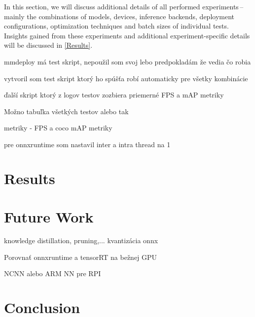 In this section, we will discuss additional details of all performed
experiments\,--\,mainly the combinations of models, devices, inference backends,
deployment configurations, optimization techniques and batch sizes of individual
tests. Insights gained from these experiments and additional experiment-specific
details will be discussed in \autoref{Results}.



mmdeploy má test skript, nepoužil som svoj lebo predpokladám že vedia čo robia

vytvoril som test skript ktorý ho spúšťa robí automaticky pre všetky kombinácie

ďalší skript ktorý z logov testov zozbiera priemerné FPS a mAP metriky

Možno tabuľka všetkých testov alebo tak

metriky - FPS a coco mAP metriky

pre onnxruntime som nastavil inter a intra thread na 1








\chapter{Results}
\label{Results}





\chapter{Future Work}

knowledge distillation, pruning,... kvantizácia onnx

Porovnať onnxruntime a tensorRT na bežnej GPU

NCNN alebo ARM NN pre RPI




\chapter{Conclusion}



% 